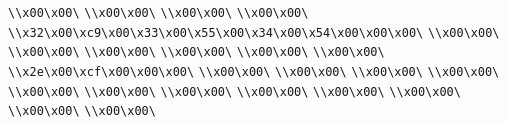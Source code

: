 \verb|\\x00\x00\|\newline
\verb|\\x00\x00\|\newline
\verb|\\x00\x00\|\newline
\verb|\\x00\x00\|\newline
\verb|\\x32\x00\xc9\x00\x33\x00\x55\x00\x34\x00\x54\x00\x00\x00\|\newline
\verb|\\x00\x00\|\newline
\verb|\\x00\x00\|\newline
\verb|\\x00\x00\|\newline
\verb|\\x00\x00\|\newline
\verb|\\x00\x00\|\newline
\verb|\\x00\x00\|\newline
\verb|\\x2e\x00\xcf\x00\x00\x00\|\newline
\verb|\\x00\x00\|\newline
\verb|\\x00\x00\|\newline
\verb|\\x00\x00\|\newline
\verb|\\x00\x00\|\newline
\verb|\\x00\x00\|\newline
\verb|\\x00\x00\|\newline
\verb|\\x00\x00\|\newline
\verb|\\x00\x00\|\newline
\verb|\\x00\x00\|\newline
\verb|\\x00\x00\|\newline
\verb|\\x00\x00\|\newline
\verb|\\x00\x00\|\newline
